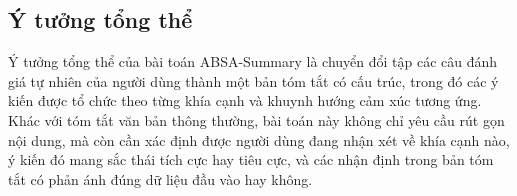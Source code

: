 


\subsection{Ý tưởng tổng thể}

Ý tưởng tổng thể của bài toán ABSA-Summary là chuyển đổi tập các câu đánh giá tự nhiên của người dùng thành một bản tóm tắt có cấu trúc, trong đó các ý kiến được tổ chức theo từng khía cạnh và khuynh hướng cảm xúc tương ứng. Khác với tóm tắt văn bản thông thường, bài toán này không chỉ yêu cầu rút gọn nội dung, mà còn cần xác định được người dùng đang nhận xét về khía cạnh nào, ý kiến đó mang sắc thái tích cực hay tiêu cực, và các nhận định trong bản tóm tắt có phản ánh đúng dữ liệu đầu vào hay không.


